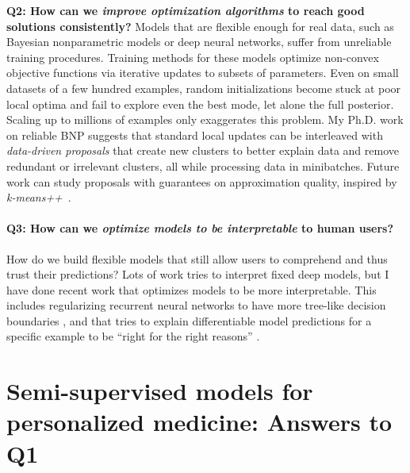 \documentclass[11pt,letterpaper]{article}
\begin{document}

\textbf{Q2: How can we \emph{improve optimization algorithms} to reach good solutions consistently?} 
Models that are flexible enough for real data, such as Bayesian nonparametric models or deep neural networks,
suffer from unreliable training procedures.
Training methods for these models optimize non-convex objective functions via iterative updates to subsets of parameters. Even on small datasets of a few hundred examples, random initializations become stuck at poor local optima and fail to explore even the best mode, let alone the full posterior. Scaling up to millions of examples only exaggerates this problem.
My Ph.D. work on reliable BNP suggests that standard local updates can be interleaved with \emph{data-driven proposals} that create new clusters to better explain data and remove redundant or irrelevant clusters, all while processing data in minibatches. Future work can study proposals with guarantees on approximation quality, inspired by \emph{k-means++}~\citep{arthur2007kmeansplusplus}. 

\paragraph{{Q3: How can we \emph{optimize models to be interpretable} to human users?}}
How do we build flexible models that still allow users to comprehend and thus trust their predictions?
Lots of work tries to interpret fixed deep models, but
I have done recent work that optimizes models to be more interpretable.
This includes regularizing recurrent neural networks to have more tree-like decision boundaries \cite{wu2017treeregularization}, and that tries to explain differentiable model predictions for a specific example to be ``right for the right reasons'' \cite{ross2017rrr}.

\section{Semi-supervised models for personalized medicine: Answers to Q1}
\end{document}
